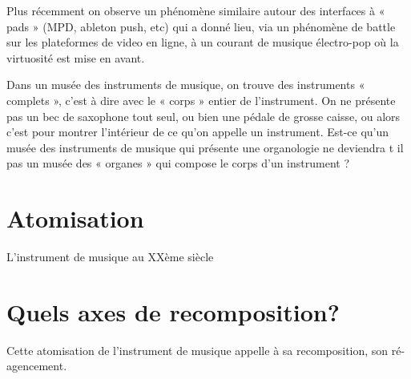 Plus récemment on observe un phénomène similaire autour des interfaces à « pads » (MPD, ableton push, etc) qui a donné lieu, via un phénomène de battle sur les plateformes de video en ligne, à un courant de musique électro-pop où la virtuosité est mise en avant.

Dans un musée des instruments de musique, on trouve des instruments « complets », c’est à dire avec le « corps » entier de l’instrument. On ne présente pas un bec de saxophone tout seul, ou bien une pédale de grosse caisse, ou alors c’est pour montrer l’intérieur de ce qu’on appelle un instrument. Est-ce qu’un musée des instruments de musique qui présente une organologie ne deviendra t il pas un musée des « organes » qui compose le corps d’un instrument ?



\section{Atomisation}
\label{sec:introduction:atomisation}
L'instrument de musique au XXème siècle 


\section{Quels axes de recomposition?}
\label{sec:introduction:axes}

Cette atomisation de l'instrument de musique appelle à sa recomposition, son ré-agencement. 